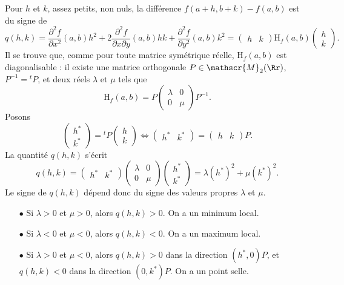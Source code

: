 \documentclass[12pt, class=report,crop=false]{standalone}
\begin{document}
{\vskip4mm

Pour $h$ et $k$, assez petits, non nuls, la différence $f(a+h,b+k)-f(a,b)$ est du signe de
$$q(h,k)=\frac{\partial ^2f}{\partial x^2}(a,b)h^2+2\frac{\partial ^2f}{\partial x\partial y }(a,b)hk+\frac{\partial ^2f}{\partial y^2}(a,b)k^2=\left(\begin{array}{cc}h&k
\end{array}\right)\mbox{H}_f(a,b)\left(\begin{array}{c}h\\k\end{array}\right).$$
Il se trouve que, comme pour toute matrice symétrique réelle, $\mbox{H}_f(a,b)$ est diagonalisable : il existe une matrice orthogonale $P\in \mathscr{M}_2(\Rr)$, $P^{-1}={^tP}$, et deux réels $\lambda$ et $\mu$ tels que 
$$\mbox{H}_f(a,b)=P\left(\begin{array}{cc}\lambda &0\\ 0&\mu\end{array}\right)P^{-1}.$$
Posons
$$\left(\begin{array}{c}h^*\\k^*\end{array}\right)={^tP}\left(\begin{array}{c}h\\k\end{array}\right) \Leftrightarrow \left(\begin{array}{cc}h^*&k^*\end{array}\right)=\left(\begin{array}{cc}h&k\end{array}\right)P.$$
La quantité $q(h,k)$ s'écrit
$$q(h,k)=\left(\begin{array}{cc}h^*&k^*\end{array}\right)\left(\begin{array}{cc}\lambda &0\\ 0&\mu\end{array}\right)\left(\begin{array}{c}h^*\\k^*\end{array}\right)=\lambda (h^*)^2+\mu (k^*)^2.$$
Le signe de $q(h,k)$ dépend donc du signe des valeurs propres $\lambda$ et $\mu$.
\begin{enumerate}
\item[$\bullet$] Si $\lambda >0$ et $\mu >0$, alors $q(h,k)>0$. On a un minimum local.
\item[$\bullet$] Si $\lambda <0$ et $\mu <0$, alors $q(h,k)<0$. On a un maximum local.
\item[$\bullet$] Si $\lambda >0$ et $\mu <0$, alors $q(h,k)>0$ dans la direction $(h^*,0)P$, et $q(h,k)<0$ dans la direction $(0,k^*)P$. On a un point selle.
\end{enumerate}

}
\end{document}
